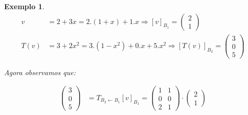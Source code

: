 \documentclass{article}
\newcommand{\mudabase}[3] {#1_{#2 \leftarrow #3}}
\newcommand{\vetor}[2] {\begin{pmatrix}#1\\#2\end{pmatrix}} %
\newtheorem{example}{Exemplo}[section]
\begin{document}
\begin{example}
                \begin{align*}
                    v &= 2 + 3x = 2.(1 + x) + 1.x \Rightarrow [v]_{B_1} = \vetor{2}{1}\\
                    T(v) &= 3 + 2x^2 = 3.(1 - x^2) + 0.x + 5.x^2 \Rightarrow [T(v)]_{B_2} = \begin{pmatrix}3\\0\\5\end{pmatrix}
                \end{align*}

                Agora observamos que:

                \begin{align*}
                    \begin{pmatrix}3\\0\\5\end{pmatrix} &= \mudabase{T}{B_2}{B_1} [v]_{B_1} = \begin{pmatrix}1&1\\0&0\\2&1\end{pmatrix} \cdot \vetor{2}{1}
                \end{align*}
            \end{example}
\end{document}
